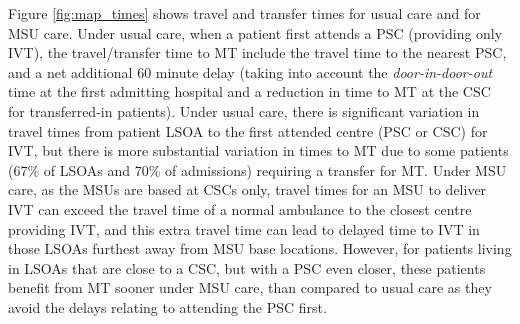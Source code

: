 Figure \ref{fig:map_times} shows travel and transfer times for usual care and for MSU care. Under usual care, when a patient first attends a PSC (providing only IVT), the travel/transfer time to MT include the travel time to the nearest PSC, and a net additional 60 minute delay (taking into account the \textit{door-in-door-out} time at the first admitting hospital and a reduction in time to MT at the CSC for transferred-in patients). Under usual care, there is significant variation in travel times from patient LSOA to the first attended centre (PSC or CSC) for IVT, but there is more substantial variation in times to MT due to some patients (67\% of LSOAs and 70\% of admissions) requiring a transfer for MT. Under MSU care, as the MSUs are based at CSCs only, travel times for an MSU to deliver IVT can exceed the travel time of a normal ambulance to the closest centre providing IVT, and this extra travel time can lead to delayed time to IVT in those LSOAs furthest away from MSU base locations. However, for patients living in LSOAs that are close to a CSC, but with a PSC even closer, these patients benefit from MT sooner under MSU care, than compared to usual care as they avoid the delays relating to attending the PSC first.

